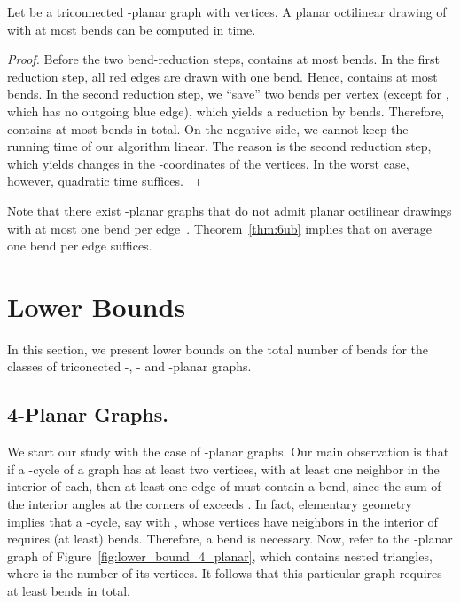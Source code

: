 \documentclass[a4paper,twoside,11pt]{article}
\begin{document}
\begin{theorem}
Let  be a triconnected -planar graph with  vertices. A
planar octilinear drawing  of  with at most 
bends can be computed in  time.
\label{thm:6ub} 
\end{theorem}
\begin{proof}
Before the two bend-reduction steps,  contains at most
 bends. In the first reduction step, all red edges are drawn
with one bend. Hence,  contains at most  bends. In
the second reduction step, we ``save'' two bends per vertex (except
for , which has no outgoing blue edge), which yields a
reduction by  bends. Therefore,  contains at most
 bends in total. On the negative side, we cannot keep the
running time of our algorithm linear. The reason is the second
reduction step, which yields changes in the -coordinates of the
vertices. In the worst case, however, quadratic time suffices.
\end{proof}

Note that there exist -planar graphs that do not admit planar
octilinear drawings with at most one bend per edge~\cite{BGKK14}.
Theorem~\ref{thm:6ub} implies that on average one bend per edge
suffices.

\section{Lower Bounds}
\label{sec:lowerbounds}


In this section, we present lower bounds on the total number of
bends for the classes of triconected -, - and -planar
graphs.

\subsection{4-Planar Graphs.} 
\label{sec:4planarl}


We start our study with the case of -planar graphs.
Our main observation is that if a -cycle  of a
graph has at least two vertices, with at least one neighbor in the
interior of  each, then at least one edge of
 must contain a bend, since the sum of the interior
angles at the corners of  exceeds . In
fact, elementary geometry implies that a -cycle, say
 with , whose vertices have 
neighbors in the interior of  requires (at least)
 bends.
Therefore, a bend is necessary. Now, refer to the -planar graph
of Figure~\ref{fig:lower_bound_4_planar}, which contains  nested
triangles, where  is the number of its vertices. It follows that
this particular graph requires at least  bends in total.
\end{document}
